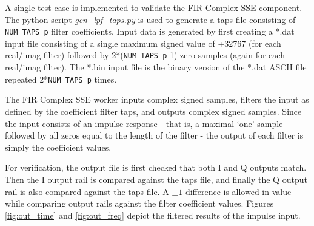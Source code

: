 \documentclass{article}
\begin{document}
\begin{flushleft}
A single test case is implemented to validate the FIR Complex SSE component. The python script \textit{gen\_lpf\_taps.py} is used to generate a taps file consisting of \verb+NUM_TAPS_p+ filter coefficients. Input data is generated by first creating a *.dat input file consisting of a single maximum signed value of +32767 (for each real/imag filter) followed by 2*(\verb+NUM_TAPS_p+-1) zero samples (again for each real/imag filter). The *.bin input file is the binary version of the *.dat ASCII file repeated 2*\verb+NUM_TAPS_p+ times.\medskip

The FIR Complex SSE worker inputs complex signed samples, filters the input as defined by the coefficient filter taps, and outputs complex signed samples. Since the input consists of an impulse response - that is, a maximal `one' sample followed by all zeros equal to the length of the filter - the output of each filter is simply the coefficient values.\medskip

For verification, the output file is first checked that both I and Q outputs match. Then the I output rail is compared against the taps file, and finally the Q output rail is also compared against the taps file. A $\pm1$ difference is allowed in value while comparing output rails against the filter coefficient values. Figures \ref{fig:out_time} and \ref{fig:out_freq} depict the filtered results of the impulse input.
\end{flushleft}
\end{document}
